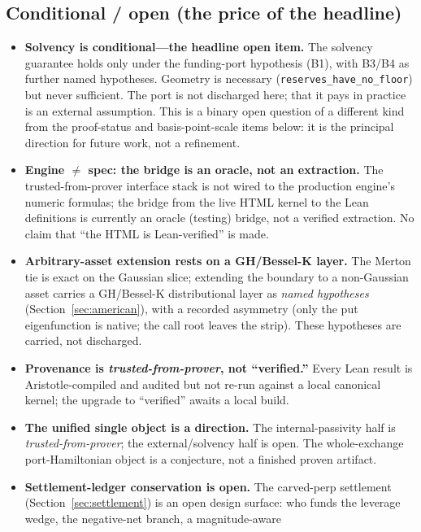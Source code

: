 \documentclass[runningheads]{llncs}
\newcommand{\tfp}{\emph{trusted-from-prover}}
\begin{document}
\subsection{Conditional / open (the price of the headline)}
\begin{itemize}[leftmargin=2em]
  \item \textbf{Solvency is conditional---the headline open item.} The solvency
        guarantee holds only under the funding-port hypothesis (B1), with B3/B4 as
        further named hypotheses. Geometry is necessary
        (\texttt{reserves\_have\_no\_floor}) but never sufficient. The port is not
        discharged here; that it pays in practice is an external assumption. This
        is a binary open question of a different kind from the proof-status and
        basis-point-scale items below: it is the principal direction for future
        work, not a refinement.
  \item \textbf{Engine $\neq$ spec: the bridge is an oracle, not an extraction.}
        The trusted-from-prover interface stack is not wired to the production
        engine's numeric formulas; the bridge from the live HTML kernel to the Lean
        definitions is currently an oracle (testing) bridge, not a verified
        extraction. No claim that ``the HTML is Lean-verified'' is made.
  \item \textbf{Arbitrary-asset extension rests on a GH/Bessel-K layer.} The
        Merton tie is exact on the Gaussian slice; extending the boundary to a
        non-Gaussian asset carries a GH/Bessel-K distributional layer as
        \emph{named hypotheses} (Section~\ref{sec:american}), with a recorded
        asymmetry (only the put eigenfunction is native; the call root leaves the
        strip). These hypotheses are carried, not discharged.
  \item \textbf{Provenance is \tfp{}, not ``verified.''} Every Lean result is
        Aristotle-compiled and audited but not re-run against a local canonical
        kernel; the upgrade to ``verified'' awaits a local build.
  \item \textbf{The unified single object is a direction.} The internal-passivity
        half is \tfp{}; the external/solvency half is open. The whole-exchange
        port-Hamiltonian object is a conjecture, not a finished proven artifact.
  \item \textbf{Settlement-ledger conservation is open.} The carved-perp
        settlement (Section~\ref{sec:settlement}) is an open design surface: who
        funds the leverage wedge, the negative-net branch, a magnitude-aware

\end{itemize}
\end{document}
